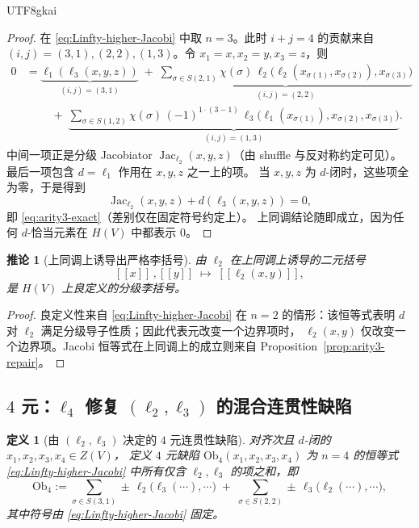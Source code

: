 \documentclass[12pt]{article}
\newtheorem{definition}{定义}[section]
\newtheorem{corollary}{推论}[section]
\newcommand{\Layer}{\ensuremath{\ell}}
\newcommand{\Jac}{\operatorname{Jac}}
\newcommand{\Ob}{\mathrm{Ob}}
\begin{document}
\begin{CJK*}{UTF8}{gkai}
\begin{proof}
在 \eqref{eq:Linfty-higher-Jacobi} 中取 $n=3$。此时 $i+j=4$ 的贡献来自
$(i,j)=(3,1),(2,2),(1,3)$。令 $x_1=x,x_2=y,x_3=z$，则
\begin{align*}
0
&=
\underbrace{\Layer_1(\Layer_3(x,y,z))}_{(i,j)=(3,1)}
\;+\;
\underbrace{\sum_{\sigma\in S(2,1)}\chi(\sigma)\,
\Layer_2\bigl(\Layer_2(x_{\sigma(1)},x_{\sigma(2)}),x_{\sigma(3)}\bigr)}_{(i,j)=(2,2)}
\\
&\qquad
\;+\;
\underbrace{\sum_{\sigma\in S(1,2)}\chi(\sigma)\,
(-1)^{1\cdot(3-1)}\,
\Layer_3\bigl(\Layer_1(x_{\sigma(1)}),x_{\sigma(2)},x_{\sigma(3)}\bigr)}_{(i,j)=(1,3)}.
\end{align*}
中间一项正是分级 Jacobiator $\Jac_{\Layer_2}(x,y,z)$（由 shuffle 与反对称约定可见）。
最后一项包含 $d=\Layer_1$ 作用在 $x,y,z$ 之一上的项。
当 $x,y,z$ 为 $d$-闭时，这些项全为零，于是得到
\[
  \Jac_{\Layer_2}(x,y,z) + d(\Layer_3(x,y,z)) = 0,
\]
即 \eqref{eq:arity3-exact}（差别仅在固定符号约定上）。
上同调结论随即成立，因为任何 $d$-恰当元素在 $H(V)$ 中都表示 $0$。
\end{proof}

\begin{corollary}[上同调上诱导出严格李括号]
\label{cor:H-Lie}
由 $\Layer_2$ 在上同调上诱导的二元括号
\[
  [\![x]\!]\,,[\![y]\!]\;\mapsto\;[\![\Layer_2(x,y)]\!],
\]
是 $H(V)$ 上良定义的分级李括号。
\end{corollary}

\begin{proof}
良定义性来自 \eqref{eq:Linfty-higher-Jacobi} 在 $n=2$ 的情形：该恒等式表明
$d$ 对 $\Layer_2$ 满足分级导子性质；因此代表元改变一个边界项时，
$\Layer_2(x,y)$ 仅改变一个边界项。Jacobi 恒等式在上同调上的成立则来自
Proposition~\ref{prop:arity3-repair}。
\end{proof}


\subsection{$4$ 元：$\Layer_4$ 修复 $(\Layer_2,\Layer_3)$ 的混合连贯性缺陷}

\begin{definition}[由 $(\Layer_2,\Layer_3)$ 决定的 $4$ 元连贯性缺陷]
\label{def:arity4-obstruction}
对齐次且 $d$-闭的 $x_1,x_2,x_3,x_4\in Z(V)$，
定义 $4$ 元缺陷 $\Ob_4(x_1,x_2,x_3,x_4)$ 为
$n=4$ 的恒等式 \eqref{eq:Linfty-higher-Jacobi} 中所有仅含 $\Layer_2,\Layer_3$ 的项之和，即
\[
  \Ob_4 :=
  \sum_{\sigma\in S(3,1)} \pm\,\Layer_2\bigl(\Layer_3(\cdots),\cdots\bigr)
  \;+\;
  \sum_{\sigma\in S(2,2)} \pm\,\Layer_3\bigl(\Layer_2(\cdots),\cdots\bigr),
\]
其中符号由 \eqref{eq:Linfty-higher-Jacobi} 固定。
\end{definition}


\end{CJK*}
\end{document}

